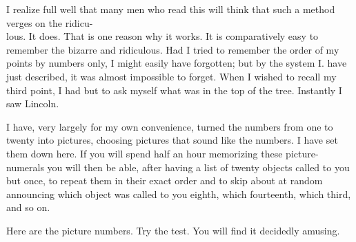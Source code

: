 \documentclass[10pt]{article}
\begin{document}
I realize full well that many men who read this will think that such a method verges on the ridicu-\\
lous. It does. That is one reason why it works. It is comparatively easy to remember the bizarre and ridiculous. Had I tried to remember the order of my points by numbers only, I might easily have forgotten; but by the system I. have just described, it was almost impossible to forget. When I wished to recall my third point, I had but to ask myself what was in the top of the tree. Instantly I saw Lincoln.

I have, very largely for my own convenience, turned the numbers from one to twenty into pictures, choosing pictures that sound like the numbers. I have set them down here. If you will spend half an hour memorizing these picture-numerals you will then be able, after having a list of twenty objects called to you but once, to repeat them in their exact order and to skip about at random announcing which object was called to you eighth, which fourteenth, which third, and so on.

Here are the picture numbers. Try the test. You will find it decidedly amusing.
\end{document}
